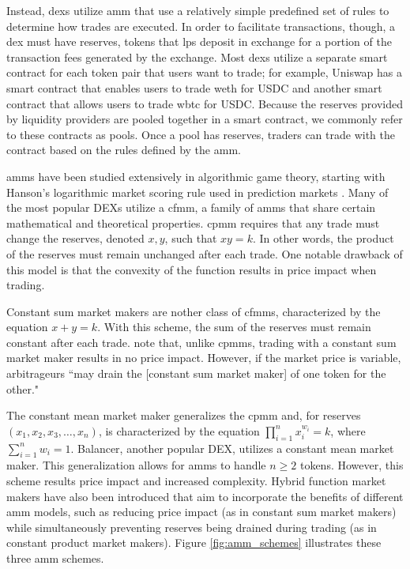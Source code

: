 \documentclass[11pt]{article}
\begin{document}
Instead, \glspl{dex} utilize \gls{amm} that use a relatively simple predefined set of rules to determine how trades are executed. In order to facilitate transactions, though, a \gls{dex} must have reserves, tokens that \glspl{lp} deposit in exchange for a portion of the transaction fees generated by the exchange. Most \glspl{dex} utilize a separate smart contract for each token pair that users want to trade; for example, Uniswap has a smart contract that enables users to trade \gls{weth} for USDC and another smart contract that allows users to trade \gls{wbtc} for USDC. Because the reserves provided by liquidity providers are pooled together in a smart contract, we commonly refer to these contracts as pools. Once a \gls{pool} has reserves, traders can trade with the contract based on the rules defined by the \gls{amm}.

\glspl{amm} have been studied extensively in algorithmic game theory, starting with Hanson's logarithmic market scoring rule used in prediction markets \cite{LMSR}. Many of the most popular DEXs utilize a \gls{cfmm}, a family of \glspl{amm} that share certain mathematical and theoretical properties. \gls{cpmm} requires that any trade must change the reserves, denoted $x, y$, such that $xy = k$. In other words, the product of the reserves must remain unchanged after each trade. One notable drawback of this model is that the convexity of the function results in price impact when trading.

Constant sum market makers are nother class of \glspl{cfmm}, characterized by the equation $x + y = k$. With this scheme, the sum of the reserves must remain constant after each trade. \citet{AMMClasses} note that, unlike \glspl{cpmm}, trading with a constant sum market maker results in no price impact. However, if the market price is variable, arbitrageurs ``may drain the [constant sum market maker] of one token for the other."

The constant mean market maker generalizes the \gls{cpmm} and, for reserves $(x_1, x_2, x_3, \dots, x_n)$, is characterized by the equation $\prod_{i=1}^{n}x_i^{w_i} = k$, where $\sum_{i=1}^{n}w_i = 1$. Balancer, another popular DEX, utilizes a constant mean market maker. This generalization allows for \glspl{amm} to handle $n \ge 2$ tokens. However, this scheme results price impact and increased complexity. Hybrid function market makers have also been introduced that aim to incorporate the benefits of different \gls{amm} models, such as reducing price impact (as in constant sum market makers) while simultaneously preventing reserves being drained during trading (as in constant product market makers). Figure \ref{fig:amm_schemes} illustrates these three \gls{amm} schemes.
\end{document}
